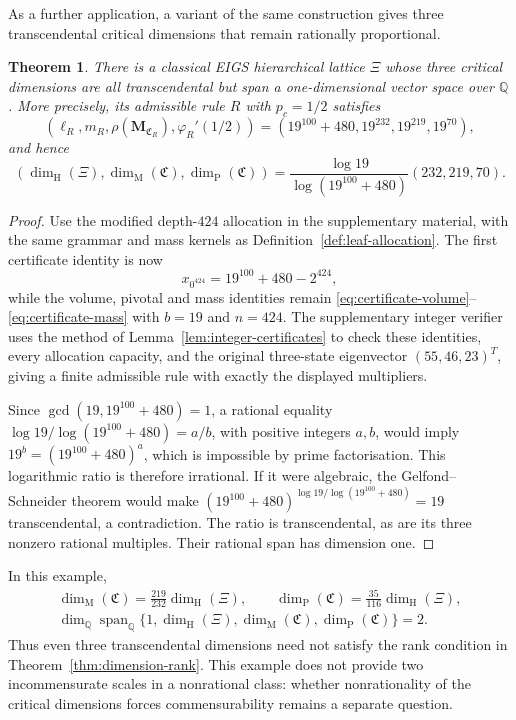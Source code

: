 \documentclass[scheme=plain,11pt]{ctexart}
\newtheorem{theorem}{Theorem}[section]
\theoremstyle{definition}
\theoremstyle{remark}
\begin{document}
As a further application, a variant of the same construction gives three transcendental critical dimensions that remain rationally proportional.

\begin{theorem}\label{thm:transcendental-dependent-dimensions}
There is a classical EIGS hierarchical lattice $\Xi$ whose three critical dimensions are all transcendental but span a one-dimensional vector space over $\mathbb Q$. More precisely, its admissible rule $R$ with $p_c=1/2$ satisfies
\[
 (\ell_R,m_R,\rho(\mathbf M_{\mathfrak C_R}),\varphi_R'(1/2))
 =(19^{100}+480,19^{232},19^{219},19^{70}),
\]
and hence
\[
 (\dim_{\mathrm H}(\Xi),\dim_{\mathrm M}(\mathfrak C),\dim_{\mathrm P}(\mathfrak C))
 =\frac{\log19}{\log(19^{100}+480)}(232,219,70).
\]
\end{theorem}
\begin{proof}
Use the modified depth-$424$ allocation in the supplementary material, with the same grammar and mass kernels as Definition~\ref{def:leaf-allocation}. The first certificate identity is now
\[
 x_{0^{424}}=19^{100}+480-2^{424},
\]
while the volume, pivotal and mass identities remain
\eqref{eq:certificate-volume}--\eqref{eq:certificate-mass} with $b=19$ and $n=424$.
The supplementary integer verifier uses the method of Lemma~\ref{lem:integer-certificates} to check these identities, every allocation capacity, and the original three-state eigenvector $(55,46,23)^T$, giving a finite admissible rule with exactly the displayed multipliers.

Since $\gcd(19,19^{100}+480)=1$, a rational equality
$\log19/\log(19^{100}+480)=a/b$, with positive integers $a,b$, would imply $19^b=(19^{100}+480)^a$, which is impossible by prime factorisation. This logarithmic ratio is therefore irrational. If it were algebraic, the Gelfond--Schneider theorem would make
$(19^{100}+480)^{\log19/\log(19^{100}+480)}=19$
transcendental, a contradiction. The ratio is transcendental, as are its three nonzero rational multiples. Their rational span has dimension one.
\end{proof}

In this example,
\begin{gather*}
 \dim_{\mathrm M}(\mathfrak C)=\frac{219}{232}\dim_{\mathrm H}(\Xi),\qquad
 \dim_{\mathrm P}(\mathfrak C)=\frac{35}{116}\dim_{\mathrm H}(\Xi),\\
 \dim_{\mathbb Q}\operatorname{span}_{\mathbb Q}
 \{1,\dim_{\mathrm H}(\Xi),\dim_{\mathrm M}(\mathfrak C),\dim_{\mathrm P}(\mathfrak C)\}=2.
\end{gather*}
Thus even three transcendental dimensions need not satisfy the rank condition in Theorem~\ref{thm:dimension-rank}. This example does not provide two incommensurate scales in a nonrational class: whether nonrationality of the critical dimensions forces commensurability remains a separate question.
\end{document}
